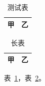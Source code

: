 \documentclass{ctexart}
\begin{document}
\begin{table}[htbp]
\centering
\caption{测试表}\label{tab:test}
\begin{tabular}{cc}\toprule 甲&乙\\\bottomrule\end{tabular}
\end{table}
\begin{longtable}{cc}
\caption{长表}\label{tab:long}\\
\toprule 甲&乙\\
\bottomrule
\end{longtable}
表~\ref{tab:test}，表~\ref{tab:long}。
\end{document}
